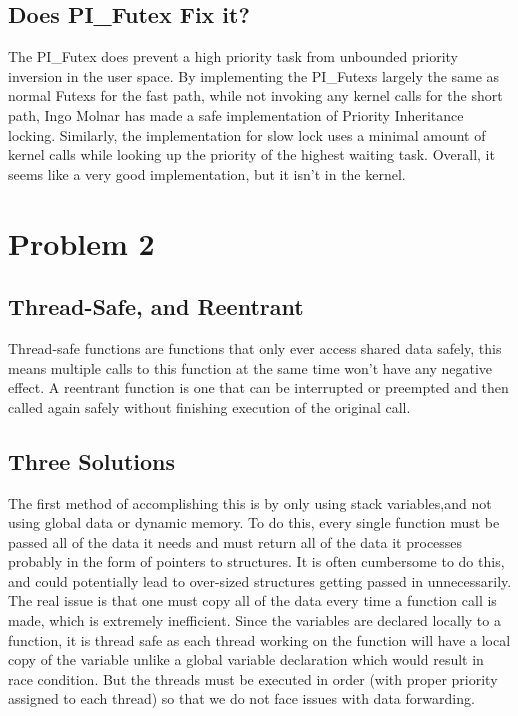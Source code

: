 \documentclass{article}
\begin{document}
\subsection*{Does PI\_Futex Fix it?}
The PI\_Futex does prevent a high priority task from unbounded priority inversion in the user space. By implementing the PI\_Futexs largely the same as normal Futexs for the fast path, while not invoking any kernel calls for the short path, Ingo Molnar has made a safe implementation of Priority Inheritance locking. Similarly, the implementation for slow lock uses a minimal amount of kernel calls while looking up the priority of the highest waiting task. Overall, it seems like a very good implementation, but it isn't in the kernel. 


\section*{Problem 2}
\subsection*{Thread-Safe, and Reentrant}
Thread-safe functions are functions that only ever access shared data safely, this means multiple calls to this function at the same time won't have any negative effect. A reentrant function is one that can be interrupted or preempted and then called again safely without finishing execution of the original call.

\subsection*{Three Solutions}
The first method of accomplishing this is by only using stack variables,and not using global data or dynamic memory. To do this, every single function must be passed all of the data it needs and must return all of the data it processes probably in the form of pointers to structures. It is often cumbersome to do this, and could potentially lead to over-sized structures getting passed in unnecessarily. The real issue is that one must copy all of the data every time a function call is made, which is extremely inefficient.
Since the variables are declared locally to a function, it is thread safe as each thread working on the function will have a local copy of the variable unlike a global variable declaration which would result in race condition. But the threads must be executed in order (with proper priority assigned to each thread) so that we do not face issues with data forwarding. 
\end{document}
